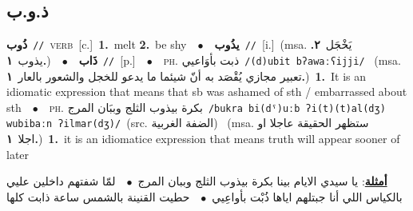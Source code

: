 \documentclass[10pt,a4paper,twoside]{article} %
\begin{document}
\begin{multicols}{2}
{{{{{{{{\vspace{-3mm}
\subsection*{\color{blue}\foreignlanguage{arabic}{ذ.و.ب}\color{blue}{}} 

{\setlength\topsep{0pt}\textbf{\foreignlanguage{arabic}{ذُوب}}\ {\color{gray}\texttt{//}\color{black}}\ \textsc{verb}\ [c.]\ \textbf{1.}~melt  \textbf{2.}~be shy\ \ $\bullet$\ \ \setlength\topsep{0pt}\textbf{\foreignlanguage{arabic}{يذُوب}}\ {\color{gray}\texttt{//}\color{black}}\ [i.]\ \color{gray}(msa. \foreignlanguage{arabic}{يَخْجَل}~\foreignlanguage{arabic}{\textbf{٢.}}  \foreignlanguage{arabic}{يذوب}~\foreignlanguage{arabic}{\textbf{١.}})\color{black}\ \ $\bullet$\ \ \setlength\topsep{0pt}\textbf{\foreignlanguage{arabic}{ذَاب}}\ {\color{gray}\texttt{//}\color{black}}\ [p.]\ \ $\bullet$\ \ \textsc{ph.} \color{gray} \foreignlanguage{arabic}{ذبت بأوَاعيي}\color{black}\ {\color{gray}\texttt{/{\sffamily (d)ubit bʔawaːʕijji}/}\color{black}}\ \color{gray} (msa. \foreignlanguage{arabic}{تعبير مجازي يُقْصَد به أنّ شيئما ما يدعو للخجل والشعور بالعار}~\foreignlanguage{arabic}{\textbf{١.}})\color{black}\ \textbf{1.}~It is an idiomatic expression that means that sb was ashamed of sth / embarrassed about sth\ \ $\bullet$\ \ \textsc{ph.} \color{gray} \foreignlanguage{arabic}{بكرة بيذوب الثلج وببَان المرج}\color{black}\ {\color{gray}\texttt{/{\sffamily bukra bi(dˤ)uːb ʔi(t)(t)al(dʒ) wubibaːn ʔilmar(dʒ)}/}\color{black}}\ \color{gray}(src. \foreignlanguage{arabic}{الضفة الغربية})\color{black}\ \color{gray} (msa. \foreignlanguage{arabic}{ستظهر الحقيقة عاجلا او اجلا}~\foreignlanguage{arabic}{\textbf{١.}})\color{black}\ \textbf{1.}~it is an idiomatice expression that means truth will appear sooner of later\  \begin{flushright}\color{gray}\foreignlanguage{arabic}{\textbf{\underline{\foreignlanguage{arabic}{أمثلة}}}: يا سيدي الايام بينا بكرة بيذوب الثلج وببان المرج\ $\bullet$\ \  لمّا شفتهم داخلين عليي بالكياس اللي أنا جبتلهم اياها ذُبْت بأواعِيي\ $\bullet$\ \  حطيت القنينة بالشمس ساعة ذابت كلها}\end{flushright}\color{black}} \vspace{2mm}

}}}}}}}}
\end{multicols}
\end{document}
